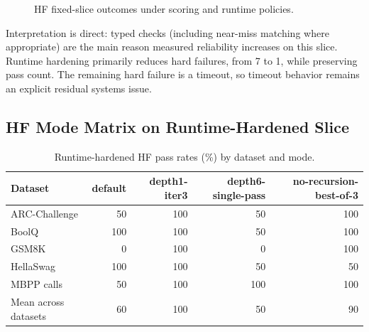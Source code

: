 \documentclass[11pt]{article}
\begin{document}
\begin{figure}[t]
\centering
{}
\caption{HF fixed-slice outcomes under scoring and runtime policies.}
\label{fig:hf-policy-stack}
\end{figure}

Interpretation is direct: typed checks (including near-miss matching where appropriate) are the main reason measured reliability increases on this slice. Runtime hardening primarily reduces hard failures, from 7 to 1, while preserving pass count. The remaining hard failure is a timeout, so timeout behavior remains an explicit residual systems issue.

\subsection{HF Mode Matrix on Runtime-Hardened Slice}
\begin{table}[t]
\centering
\caption{Runtime-hardened HF pass rates (\%) by dataset and mode.}
\label{tab:hf-matrix}
\begin{tabular}{lrrrr}
\toprule
Dataset & default & depth1-iter3 & depth6-single-pass & no-recursion-best-of-3 \\
\midrule
ARC-Challenge & 50 & 100 & 50 & 100 \\
BoolQ & 100 & 100 & 50 & 100 \\
GSM8K & 0 & 100 & 0 & 100 \\
HellaSwag & 100 & 100 & 50 & 50 \\
MBPP calls & 50 & 100 & 100 & 100 \\
\midrule
Mean across datasets & 60 & 100 & 50 & 90 \\
\bottomrule
\end{tabular}
\end{table}
\end{document}
